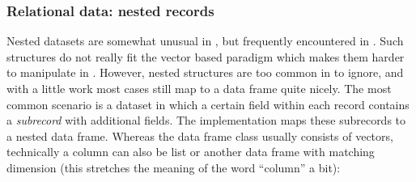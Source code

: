 \subsubsection{Relational data: nested records}

Nested datasets are somewhat unusual in \R, but frequently encountered in \JSON. Such structures do not really fit the vector based paradigm which makes them harder to manipulate in \R.  However, nested structures are too common in \JSON to ignore, and with a little work most cases still map to a data frame quite nicely. The most common scenario is a dataset in which a certain field within each record contains a \emph{subrecord} with additional fields. The \jsonlite implementation maps these subrecords to a nested data frame. Whereas the data frame class usually consists of vectors, technically a column can also be list or another data frame with matching dimension (this stretches the meaning of the word ``column'' a bit):

